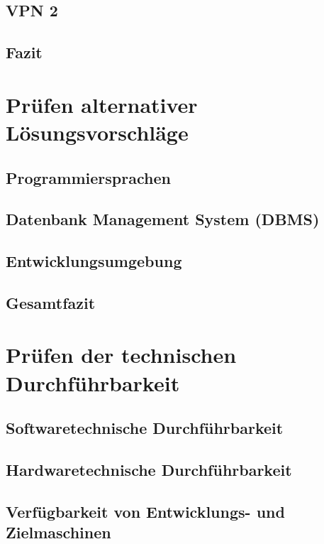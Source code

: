 \documentclass[a4paper,12pt]{scrreprt}
\begin{document}
		\subsection{VPN 2}
		
		\subsection{Fazit}
	
	\section{Pr\"ufen alternativer L\"osungsvorschl\"age}
	
		\subsection{Programmiersprachen}
		
		\subsection{Datenbank Management System (DBMS)}	
		
		\subsection{Entwicklungsumgebung}
		
		\subsection{Gesamtfazit}
			
	\section{Pr\"ufen der technischen Durchf\"uhrbarkeit}
		
		\subsection{Softwaretechnische Durchf\"uhrbarkeit}
			
		\subsection{Hardwaretechnische Durchf\"uhrbarkeit}
			
		\subsection{Verfügbarkeit von Entwicklungs- und Zielmaschinen}
			
\end{document}
